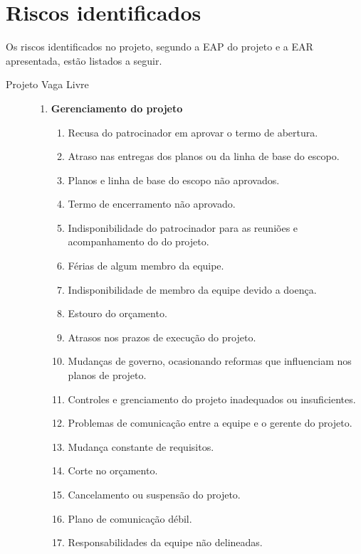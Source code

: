 \section{Riscos identificados}
\label{sec:identified-risks}

Os riscos identificados no projeto, segundo a EAP do projeto e a EAR apresentada, estão listados a seguir.

\begin{description}
	\item[Projeto Vaga Livre] \hfill
	\begin{enumerate}[label=\arabic*.]
		\item \textbf{Gerenciamento do projeto}
		      \begin{enumerate}[label*=\arabic*.]
			      \item Recusa do patrocinador em aprovar o termo de abertura.
			      \item Atraso nas entregas dos planos ou da linha de base do escopo.
			      \item Planos e linha de base do escopo não aprovados.
			      \item Termo de encerramento não aprovado.
			      \item Indisponibilidade do patrocinador para as reuniões e acompanhamento do  do projeto.
			      \item Férias de algum membro da equipe.
			      \item Indisponibilidade de membro da equipe devido a doença.
			      \item Estouro do orçamento.
			      \item Atrasos nos prazos de execução do projeto.
			      \item Mudanças de governo, ocasionando reformas que influenciam nos planos de projeto.
			      \item Controles e grenciamento do projeto inadequados ou insuficientes.
			      \item Problemas de comunicação entre a equipe e o gerente do projeto.
			      \item Mudança constante de requisitos.
			      \item Corte no orçamento.
			      \item Cancelamento ou suspensão do projeto.
			      \item Plano de comunicação débil.
			      \item Responsabilidades da equipe não delineadas.
		      \end{enumerate}

\end{enumerate}
\end{description}
